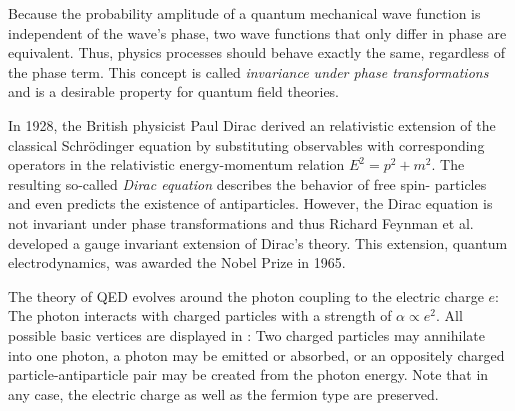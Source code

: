 Because the probability amplitude of a quantum mechanical wave function is independent of the wave's phase, two wave functions that only differ in phase are equivalent. Thus, physics processes should behave exactly the same, regardless of the phase term. This concept is called \emph{invariance under phase transformations} and is a desirable property for quantum field theories.

In 1928, the British physicist Paul Dirac derived an relativistic extension of the classical Schrödinger equation\cite{Dirac:quantumtheoryelectron} by substituting observables with corresponding operators in the relativistic energy-momentum relation $E^2 = p^2 + m^2$. The resulting so-called \emph{Dirac equation} describes the behavior of free spin- particles and even predicts the existence of antiparticles.
However, the Dirac equation is not invariant under phase transformations and thus Richard Feynman et al. developed a gauge invariant extension of Dirac's theory\cite{Feynman:Spacetimeapproach}. This extension, quantum electrodynamics, was awarded the Nobel Prize in 1965\cite{NobelMedia:NobelPrize1965}.

The theory of \ac{QED} evolves around the photon coupling to the electric charge $e$: The photon interacts with charged particles with a strength of $\alpha \propto e^2$.
All possible basic vertices are displayed in : Two charged particles may annihilate into one photon, a photon may be emitted or absorbed, or an oppositely charged particle-antiparticle pair may be created from the photon energy. Note that in any case, the electric charge as well as the fermion type are preserved.

